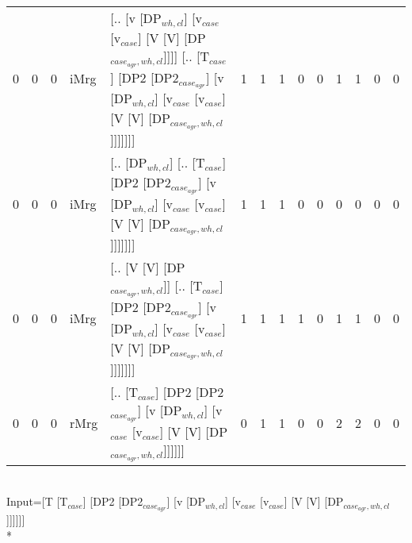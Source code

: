\begin{tabularx}{\linewidth}{rrrlXrrrrrrrrr}
   0 &       0 &   0 & iMrg & [.. [v [DP$_{wh,cl}$] [v$_{case}$ [v$_{case}$] [V [V] [DP$_{case_{agr},wh,cl}$]]]] [.. [T$_{case}$] [DP2 [DP2$_{case_{agr}}$] [v [DP$_{wh,cl}$] [v$_{case}$ [v$_{case}$] [V [V] [DP$_{case_{agr},wh,cl}$]]]]]]]                      &            1 &             1 &             1 &                  0 &              0 &           1 &           1 &              0 &            0 \\
   0 &       0 &   0 & iMrg & [.. [DP$_{wh,cl}$] [.. [T$_{case}$] [DP2 [DP2$_{case_{agr}}$] [v [DP$_{wh,cl}$] [v$_{case}$ [v$_{case}$] [V [V] [DP$_{case_{agr},wh,cl}$]]]]]]]                                                                        &            1 &             1 &             1 &                  0 &              0 &           0 &           0 &              0 &            0 \\
   0 &       0 &   0 & iMrg & [.. [V [V] [DP$_{case_{agr},wh,cl}$]] [.. [T$_{case}$] [DP2 [DP2$_{case_{agr}}$] [v [DP$_{wh,cl}$] [v$_{case}$ [v$_{case}$] [V [V] [DP$_{case_{agr},wh,cl}$]]]]]]]                                                       &            1 &             1 &             1 &                  1 &              0 &           1 &           1 &              0 &            0 \\
   0 &       0 &   0 & rMrg & [.. [T$_{case}$] [DP2 [DP2$_{case_{agr}}$] [v [DP$_{wh,cl}$] [v$_{case}$ [v$_{case}$] [V [V] [DP$_{case_{agr},wh,cl}$]]]]]]                                                                                        &            0 &             1 &             1 &                  0 &              0 &           2 &           2 &              0 &            0 \\
\hline
\end{tabularx}\endgroup\\
\begingroup\scriptsize Input=[T [T$_{case}$] [DP2 [DP2$_{case_{agr}}$] [v [DP$_{wh,cl}$] [v$_{case}$ [v$_{case}$] [V [V] [DP$_{case_{agr},wh,cl}$]]]]]]\\*
